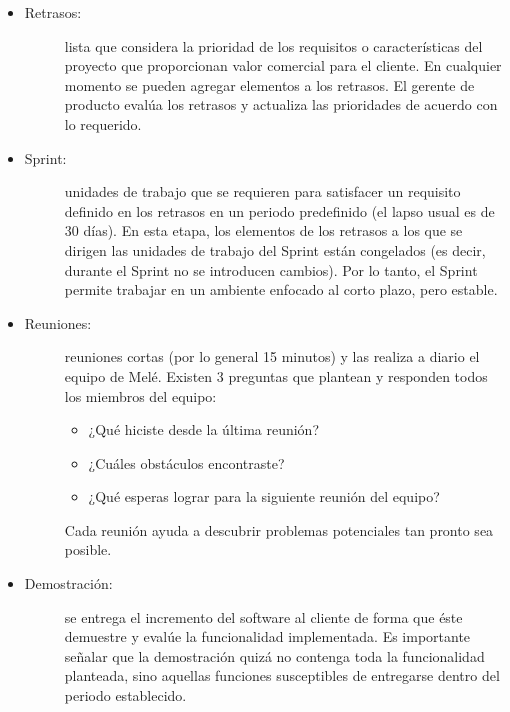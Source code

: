 \begin{itemize}
	\item 	\begin{description}
			    \item[Retrasos:] lista que considera la prioridad de los requisitos o características del proyecto que proporcionan valor comercial para el cliente. En cualquier momento se pueden agregar elementos a los retrasos. El gerente de producto evalúa los retrasos y actualiza las prioridades de acuerdo con lo requerido. 
			\end{description}

	\item 	\begin{description}
			    \item[Sprint:] unidades de trabajo que se requieren para satisfacer un requisito definido en los retrasos en un periodo predefinido (el lapso usual es de 30 días). En esta etapa, los elementos de los retrasos a los que se dirigen las unidades de trabajo del Sprint están congelados (es decir, durante el Sprint no se introducen cambios). Por lo tanto, el Sprint permite trabajar en un ambiente enfocado al corto plazo, pero estable.
			\end{description}

	\item 	\begin{description}
			    \item[Reuniones:] reuniones cortas (por lo general 15 minutos) y las realiza a diario el equipo de Melé. Existen 3 preguntas que plantean y responden todos los miembros del equipo:

			    \begin{itemize}
			    	\item ¿Qué hiciste desde la última reunión?

			    	\item ¿Cuáles obstáculos encontraste? 

			    	\item ¿Qué esperas lograr para la siguiente reunión del equipo?
			    \end{itemize}

			 	Cada reunión ayuda a descubrir problemas potenciales tan pronto sea posible.
			\end{description}

	\item 	\begin{description}
			    \item[Demostración:] se entrega el incremento del software al cliente de forma que éste demuestre y evalúe la funcionalidad implementada. Es importante señalar que la demostración quizá no contenga toda la funcionalidad planteada, sino aquellas funciones susceptibles de entregarse dentro del periodo establecido.
			\end{description}
\end{itemize}



